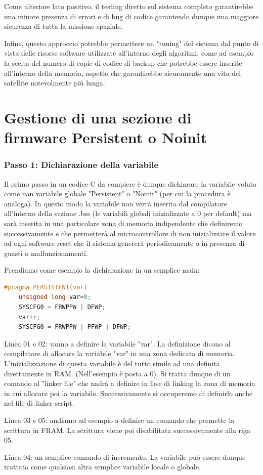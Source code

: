 \documentclass[LaM,binding=0.6cm]{../sapthesis}
\begin{document}
Come ulteriore lato positivo, il testing diretto sul sistema completo garantirebbe una  minore presenza di errori e di bug di codice garantendo dunque una maggiore 
sicurezza di tutta la missione spaziale. 

Infine, questo approccio potrebbe permettere un "tuning" del sistema dal punto di vista delle  risorse software utilizzate all'interno degli algoritmi, come ad esempio la scelta del numero di copie di codice di backup che potrebbe essere inserite all'interno della memoria,
aspetto che garantirebbe sicuramente una vita del satellite notevolmente più lunga.
\chapter{Gestione di una sezione di firmware Persistent o Noinit}

\subsection{Passo 1: Dichiarazione della variabile}
Il primo passo in un codice C da compiere è dunque dichiarare la variabile voluta come uan variabile globale "Persistent" o "Noinit" (per cui la procedura è analoga). In questo modo la variabile non verrà inserita dal compilatore all'interno della sezione .bss (le variabili globali inizializzate a 0 per default) ma sarà inserita in una particolare zona di memoria indipendente che definiremo successivamente e che permetterà al microcontrollore di non inizializzare il valore ad ogni software reset che il sistema genererà periodicamente o in presenza di guasti o malfunzionamenti.


Prendiamo come esempio la dichiarazione in un semplice main:
\begin{lstlisting}[language=C]
    #pragma PERSISTENT(var)  
    unsigned long var=0;  
    SYSCFG0 = FRWPPW | DFWP;           
    var++;   
    SYSCFG0 = FRWPPW | PFWP | DFWP; 

\end{lstlisting}
\vspace{2cm}
\begin{small}
Linea 01 e 02: vanno a definire la variabile "var". La definizione  dicono al compilatore di allocare la variabile "var" in una zona dedicata di memoria. L'inizializzazione di questa variabile è del tutto simile ad una definita direttamente in RAM. (Nell'esempio è posta a 0).
Si tratta dunque di un comando al "linker file" che andrà a definire in fase di linking la zona di memoria in cui allocare poi la variabile. Successivamente si occuperemo di definirlo anche nel file di linker script.\newline

Linea 03 e 05: andiamo ad esempio a definire un comando che permette la scrittura in FRAM. La scrittura viene poi disabilitata successivamente alla riga 05.\newline

Linea 04: un semplice comando di incremento. La variabile può essere dunque trattata come qualsiasi altra semplice variabile locale o globale.\newline

\end{small}
\end{document}
